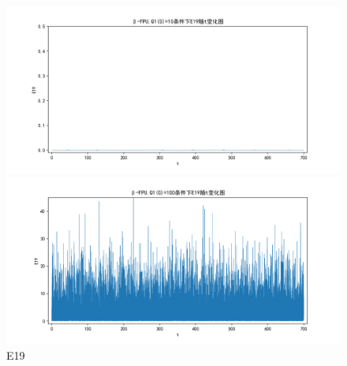 \documentclass[10pt, a4paper]{article}
\begin{document}
    \begin{figure}[H]
        \begin{minipage}[t]{0.49\textwidth}
            \centering
            \includegraphics[width=\textwidth]{./q6_pics/cmp/E19.png}
        \end{minipage}
        \begin{minipage}[t]{0.49\textwidth}
            \centering
            \includegraphics[width=\textwidth]{./q6_pics/exp/E19.png}
        \end{minipage}
        \caption{E19}\label{fig:E19 in q6}
    \end{figure}
\end{document}
